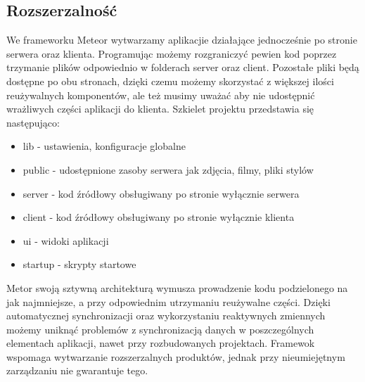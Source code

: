 \documentclass[12pt]{report}
\begin{document}
    \subsection{Rozszerzalność}
      We frameworku Meteor wytwarzamy aplikacjie działające jednocześnie po stronie serwera oraz klienta.
      Programując możemy rozgraniczyć pewien kod poprzez trzymanie plików odpowiednio w folderach server oraz client.
      Pozostałe pliki będą dostępne po obu stronach, dzięki czemu możemy skorzystać z większej ilości reużywalnych komponentów, ale też musimy uważać aby nie udostępnić wrażliwych części aplikacji do klienta.
      Szkielet projektu przedstawia się następująco:
      \begin{itemize}
        \item lib - ustawienia, konfiguracje globalne
        \item public - udostępnione zasoby serwera jak zdjęcia, filmy, pliki stylów
        \item server - kod źródłowy obsługiwany po stronie wyłącznie serwera
        \item client - kod źródłowy obsługiwany po stronie wyłącznie klienta
        \item ui - widoki aplikacji
        \item startup - skrypty startowe
      \end{itemize}
      Metor swoją sztywną architekturą wymusza prowadzenie kodu podzielonego na jak najmniejsze, a przy odpowiednim utrzymaniu reużywalne części.
      Dzięki automatycznej synchronizacji oraz wykorzystaniu reaktywnych zmiennych możemy uniknąć problemów z synchronizacją danych w poszczególnych elementach aplikacji, nawet przy rozbudowanych projektach.
      Framewok wspomaga wytwarzanie rozszerzalnych produktów, jednak przy nieumiejętnym zarządzaniu nie gwarantuje tego.      
\end{document}
